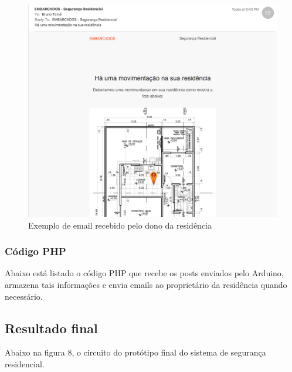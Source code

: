 \documentclass[13pt,a4]{article}
\begin{document}
\begin{figure}[!htb]
	\centering
	\includegraphics[scale=0.30]{email.png}
	\caption{Exemplo de email recebido pelo dono da residência}
	\label{}
\end{figure}

\subsubsection{Código PHP}

Abaixo está listado o código PHP que recebe os posts enviados pelo Arduino, armazena tais informações e envia emails ao proprietário da residência quando necessário.



\subsection{Resultado final}

Abaixo na figura 8, o circuito do protótipo final do sistema de segurança residencial.
\end{document}
